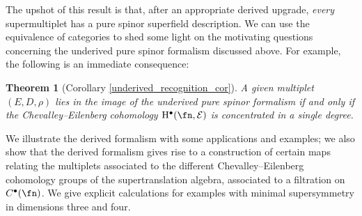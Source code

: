 \documentclass[10pt,a4paper]{amsart}
\numberwithin{equation}{section}
\newtheorem*{thm*}{Theorem}
\def\cE{\mathcal E}\def\cF{\mathcal F}\def\cG{\mathcal G}\def\cH{\mathcal H}
\def\bu{\bullet}
\begin{document}
The upshot of this result is that, after an appropriate derived upgrade, \emph{every} supermultiplet has a pure spinor superfield description.
We can use the equivalence of categories to shed some light on the motivating questions concerning the underived pure spinor formalism discussed above. For example, the following is an immediate consequence:

\begin{thm*}[Corollary \ref{underived_recognition_cor}]
	A given multiplet $(E,D,\rho)$ lies in the image of the \emph{underived} pure spinor formalism if and only if the Chevalley--Eilenberg cohomology $\mathrm H^\bullet(\fn , \cE)$ is concentrated in a single degree.
\end{thm*}

We illustrate the derived formalism with some applications and examples; we also show that the derived formalism gives rise to a construction of certain maps relating the multiplets associated to the different Chevalley--Eilenberg cohomology groups of the supertranslation algebra, associated to a filtration on $C^\bu(\fn)$. We give explicit calculations for examples with minimal supersymmetry in dimensions three and four.
\end{document}
